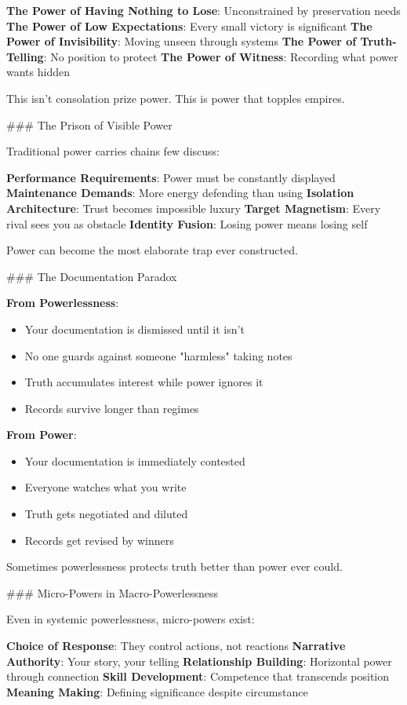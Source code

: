 \documentclass[12pt]{book}
\begin{document}
\textbf{The Power of Having Nothing to Lose}: Unconstrained by preservation needs
\textbf{The Power of Low Expectations}: Every small victory is significant  
\textbf{The Power of Invisibility}: Moving unseen through systems
\textbf{The Power of Truth-Telling}: No position to protect
\textbf{The Power of Witness}: Recording what power wants hidden

This isn't consolation prize power. This is power that topples empires.

\#\#\# The Prison of Visible Power

Traditional power carries chains few discuss:

\textbf{Performance Requirements}: Power must be constantly displayed
\textbf{Maintenance Demands}: More energy defending than using
\textbf{Isolation Architecture}: Trust becomes impossible luxury
\textbf{Target Magnetism}: Every rival sees you as obstacle
\textbf{Identity Fusion}: Losing power means losing self

Power can become the most elaborate trap ever constructed.

\#\#\# The Documentation Paradox

\textbf{From Powerlessness}:
\begin{itemize}
\item Your documentation is dismissed until it isn't
\item No one guards against someone "harmless" taking notes
\item Truth accumulates interest while power ignores it
\item Records survive longer than regimes

\end{itemize}
\textbf{From Power}:
\begin{itemize}
\item Your documentation is immediately contested
\item Everyone watches what you write
\item Truth gets negotiated and diluted
\item Records get revised by winners

\end{itemize}
Sometimes powerlessness protects truth better than power ever could.

\#\#\# Micro-Powers in Macro-Powerlessness

Even in systemic powerlessness, micro-powers exist:

\textbf{Choice of Response}: They control actions, not reactions
\textbf{Narrative Authority}: Your story, your telling
\textbf{Relationship Building}: Horizontal power through connection
\textbf{Skill Development}: Competence that transcends position
\textbf{Meaning Making}: Defining significance despite circumstance
\end{document}
